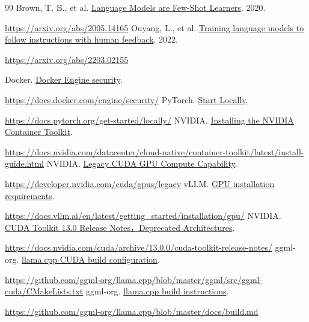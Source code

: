 \documentclass[11pt,a4paper]{article}
\begin{document}
\begin{thebibliography}{99}
 Brown, T. B., et al. \href{https://arxiv.org/abs/2005.14165}{Language Models are Few-Shot Learners}. 2020.\par\url{https://arxiv.org/abs/2005.14165}
 Ouyang, L., et al. \href{https://arxiv.org/abs/2203.02155}{Training language models to follow instructions with human feedback}. 2022.\par\url{https://arxiv.org/abs/2203.02155}

 Docker. \href{https://docs.docker.com/engine/security/}{Docker Engine security}.\par\url{https://docs.docker.com/engine/security/}
 PyTorch. \href{https://docs.pytorch.org/get-started/locally/}{Start Locally}.\par\url{https://docs.pytorch.org/get-started/locally/}
 NVIDIA. \href{https://docs.nvidia.com/datacenter/cloud-native/container-toolkit/latest/install-guide.html}{Installing the NVIDIA Container Toolkit}.\par\url{https://docs.nvidia.com/datacenter/cloud-native/container-toolkit/latest/install-guide.html}
 NVIDIA. \href{https://developer.nvidia.com/cuda/gpus/legacy}{Legacy CUDA GPU Compute Capability}.\par\url{https://developer.nvidia.com/cuda/gpus/legacy}
 vLLM. \href{https://docs.vllm.ai/en/latest/getting_started/installation/gpu/}{GPU installation requirements}.\par\url{https://docs.vllm.ai/en/latest/getting_started/installation/gpu/}
 NVIDIA. \href{https://docs.nvidia.com/cuda/archive/13.0.0/cuda-toolkit-release-notes/}{CUDA Toolkit 13.0 Release Notes，Deprecated Architectures}.\par\url{https://docs.nvidia.com/cuda/archive/13.0.0/cuda-toolkit-release-notes/}
 ggml-org. \href{https://github.com/ggml-org/llama.cpp/blob/master/ggml/src/ggml-cuda/CMakeLists.txt}{llama.cpp CUDA build configuration}.\par\url{https://github.com/ggml-org/llama.cpp/blob/master/ggml/src/ggml-cuda/CMakeLists.txt}
 ggml-org. \href{https://github.com/ggml-org/llama.cpp/blob/master/docs/build.md}{llama.cpp build instructions}.\par\url{https://github.com/ggml-org/llama.cpp/blob/master/docs/build.md}

\end{thebibliography}
\end{document}
